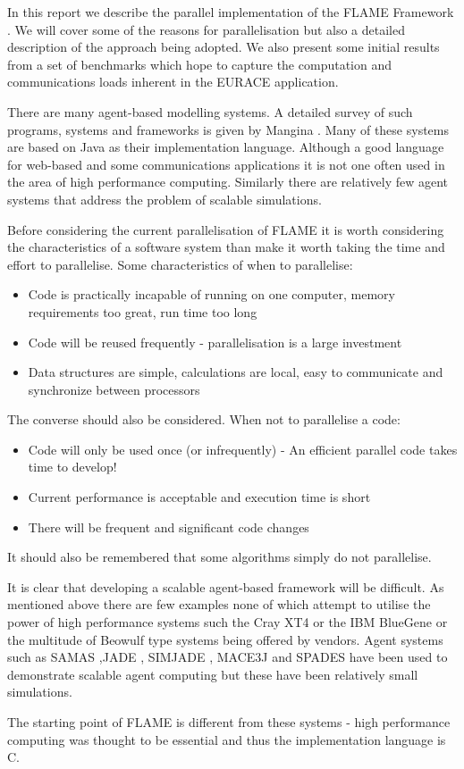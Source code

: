 In this report we describe the parallel implementation of the FLAME Framework \cite{Coakley}. We will cover some of the reasons for parallelisation but also a detailed description of the approach being adopted. We also present some initial results from a set of benchmarks which hope to capture the computation and communications loads inherent in the EURACE application.

There are many agent-based modelling systems. A detailed survey of such programs, systems and frameworks is given by Mangina \cite{Mangina}. Many of these systems are based on Java as their implementation language. Although a good language for web-based and some communications applications it is not one often used in the area of high performance computing. Similarly there are relatively few agent systems that address the problem of scalable simulations.

Before considering the current parallelisation of FLAME it is worth considering the characteristics of a software system than make it worth taking the time and effort to parallelise. Some characteristics of when to parallelise:
\begin{itemize}
\item Code is practically incapable of running on one computer, memory requirements too great, run time too long
\item Code will be reused frequently - parallelisation is a large investment
\item Data structures are simple, calculations are local, easy to communicate and synchronize between processors
\end{itemize}
The converse should also be considered. When not to parallelise a code:
\begin{itemize}
\item Code will only be used once (or infrequently) - An efficient parallel code takes time to develop!
\item Current performance is acceptable and execution time is short
\item There will be frequent and significant code changes
\end{itemize}
It should also be remembered that some algorithms simply do not parallelise.

It is clear that developing a scalable agent-based framework will be difficult. As mentioned above there are few examples none of which attempt to utilise the power of high performance systems such the Cray XT4 or the IBM BlueGene or the multitude of Beowulf type systems being offered by vendors. Agent systems such as SAMAS \cite{SAMAS},JADE \cite {JADE}, SIMJADE \cite{SIMJADE}, MACE3J \cite{MACE3J} and SPADES \cite{SPADES} have been used to demonstrate scalable agent computing but these have been relatively small simulations.

The starting point of FLAME is different from these systems - high performance computing was thought to be essential and thus the implementation language is C.
